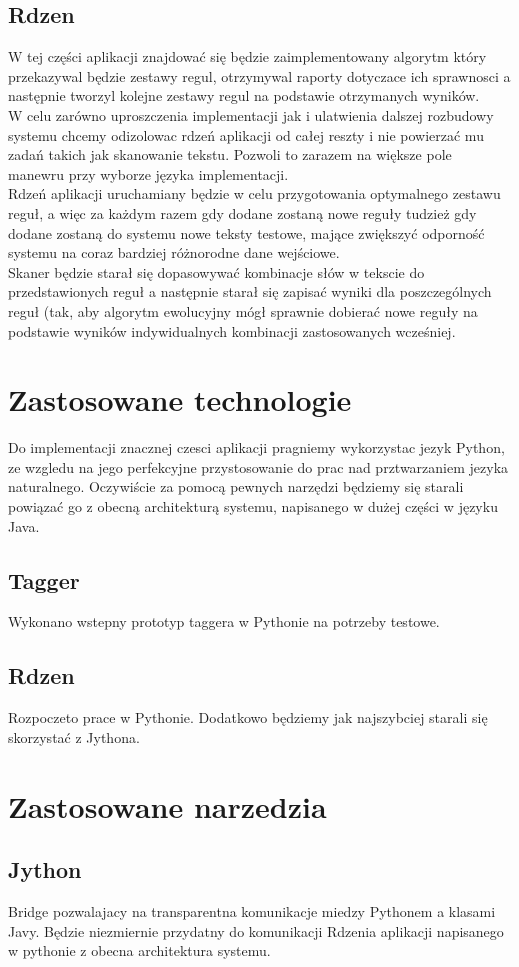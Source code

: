 \documentclass[12pt]{article}
\begin{document}
\subsection{Rdzen}
W tej części aplikacji znajdować się będzie zaimplementowany algorytm który przekazywal będzie zestawy regul, otrzymywal raporty dotyczace ich sprawnosci a następnie tworzyl kolejne zestawy regul na podstawie otrzymanych wyników. 
\\W celu zarówno uproszczenia implementacji jak i ulatwienia dalszej rozbudowy systemu chcemy odizolowac rdzeń aplikacji od całej reszty i nie powierzać mu zadań takich jak skanowanie tekstu. Pozwoli to zarazem na większe pole manewru przy wyborze języka implementacji.
\\Rdzeń aplikacji uruchamiany będzie w celu przygotowania optymalnego zestawu reguł, a więc za każdym razem gdy dodane zostaną nowe reguły tudzież gdy dodane zostaną do systemu nowe teksty testowe, mające zwiększyć odporność systemu na coraz bardziej różnorodne dane wejściowe.
\\Skaner będzie starał się dopasowywać kombinacje słów w tekscie do przedstawionych reguł a następnie starał się zapisać wyniki dla poszczególnych reguł (tak, aby algorytm ewolucyjny mógł sprawnie dobierać nowe reguły na podstawie wyników indywidualnych kombinacji zastosowanych wcześniej.
\section{Zastosowane technologie}
Do implementacji znacznej czesci aplikacji pragniemy wykorzystac jezyk Python, ze wzgledu na jego perfekcyjne przystosowanie do prac nad prztwarzaniem jezyka naturalnego.
Oczywiście za pomocą pewnych narzędzi będziemy się starali powiązać go z obecną architekturą systemu, napisanego w dużej części w języku Java.
\subsection {Tagger} 
Wykonano wstepny prototyp taggera w Pythonie na potrzeby testowe.
\subsection {Rdzen} 
Rozpoczeto prace  w Pythonie. Dodatkowo będziemy jak najszybciej starali się skorzystać z Jythona.
\section{Zastosowane narzedzia}
\subsection{Jython} Bridge pozwalajacy na transparentna komunikacje miedzy Pythonem a klasami Javy. Będzie niezmiernie przydatny do komunikacji Rdzenia aplikacji napisanego w pythonie z obecna architektura systemu.
\end{document}
